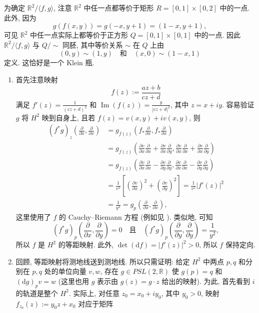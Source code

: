 \begin{description}[font=\normalfont,leftmargin=2em,labelwidth=1.5em]
为确定 $\mathbb{R}^2/\langle f,g\rangle$, 注意 $\mathbb{R}^2$ 中任一点都等价于矩形 $R=[0,1]\times[0,2]$ 中的一点. 此外, 因为
\[
  g(f(x,y))=g(-x,y+1)=(1-x,y+1),
\]
可见 $\mathbb{R}^2$ 中任一点实际上都等价于正方形 $Q=[0,1]\times[0,1]$ 中的一点. 因此 $\mathbb{R}^2/\langle f,g\rangle$ 与 $Q/{\sim}$ 同胚, 其中等价关系 $\sim$ 在 $Q$ 上由
\[
  (0,y)\sim(1,y)\quad\text{和}\quad(x,0)\sim(1-x,1)
\]
定义. 这恰好是一个 Klein 瓶.

\begin{enumerate}[label=(\alph*),ref=\alph*,leftmargin=*]
\item 首先注意映射
\[
  f(z):=\frac{az+b}{cz+d}
\]
满足 $f'(z)=\frac1{(cz+d)^2}$ 和 $\operatorname{Im}(f(z))=\frac{y}{|cz+d|^2}$, 其中 $z=x+iy$. 容易验证 $g$ 将 $H^2$ 映到自身上, 且若 $f(z)=v(x,y)+iv(x,y)$, 则
\begin{align*}
  (f^*g)_z\left(\frac{\partial}{\partial x},\frac{\partial}{\partial x}\right)
  &=g_{f(z)}\left(f_*\frac{\partial}{\partial x},f_*\frac{\partial}{\partial x}\right)\\
  &=g_{f(z)}\left(\frac{\partial v}{\partial x}\frac{\partial}{\partial x}
    +\frac{\partial v}{\partial x}\frac{\partial}{\partial y},
    \frac{\partial v}{\partial x}\frac{\partial}{\partial x}
    +\frac{\partial v}{\partial x}\frac{\partial}{\partial y}\right)\\
  &=g_{f(z)}\left(\frac{\partial v}{\partial x}\frac{\partial}{\partial x}
    -\frac{\partial v}{\partial y}\frac{\partial}{\partial y},
    \frac{\partial v}{\partial x}\frac{\partial}{\partial x}
    -\frac{\partial v}{\partial y}\frac{\partial}{\partial y}\right)\\
  &=\frac1{v^2}\left[\left(\frac{\partial v}{\partial x}\right)^2+
    \left(\frac{\partial v}{\partial y}\right)^2\right]=\frac1{v^2}|f'(z)|^2\\
  &=\frac1{y^2}=g_p\left(\frac{\partial}{\partial x},\frac{\partial}{\partial x}\right),
\end{align*}
这里使用了 $f$ 的 Cauchy–Riemann 方程 (例如见 ). 类似地, 可知
\[
  (f^*g)_p\left(\frac{\partial}{\partial x},\frac{\partial}{\partial y}\right)=0
  \quad\text{且}\quad
  (f^*g)_p\left(\frac{\partial}{\partial y},\frac{\partial}{\partial y}\right)=\frac1{y^2},
\]
所以 $f$ 是 $H^2$ 的等距映射. 此外, $\det(\mathrm{d}f)=|f'(z)|^2>0$, 所以 $f$ 保持定向.
\item\label{sol:psl-transitive-on-unit-tangents} 回顾, 等距映射将测地线送到测地线. 所以只需证明: 给定 $H^2$ 中两点 $p,q$ 和分别在 $p,q$ 处的单位向量 $v,w$, 存在 $g\in PSL(2,\mathbb{R})$ 使 $g(p)=q$ 和 $(\mathrm{d}g)_pv=w$ (这里也用 $g$ 表示由 $g(z)=g\cdot z$ 给出的映射). 为此, 首先看到 $i$ 的轨道是整个 $H^2$. 实际上, 对任意 $z_0=x_0+iy_0$, 其中 $y_0>0$, 映射 $f_{z_0}(z):=y_0z+x_0$ 对应于矩阵

\end{enumerate}
\end{description}
